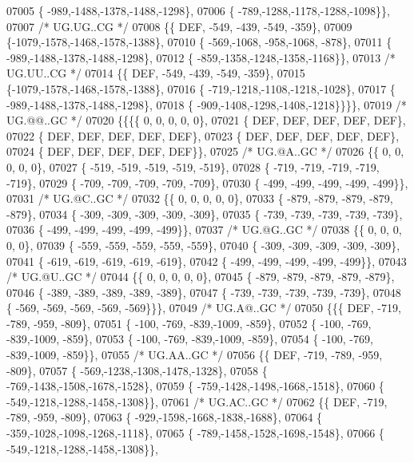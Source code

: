 \begin{DoxyCode}
07005 \{ -989,-1488,-1378,-1488,-1298\},
07006 \{ -789,-1288,-1178,-1288,-1098\}\},
07007 \textcolor{comment}{/* UG.UG..CG */}
07008 \{\{  DEF, -549, -439, -549, -359\},
07009 \{-1079,-1578,-1468,-1578,-1388\},
07010 \{ -569,-1068, -958,-1068, -878\},
07011 \{ -989,-1488,-1378,-1488,-1298\},
07012 \{ -859,-1358,-1248,-1358,-1168\}\},
07013 \textcolor{comment}{/* UG.UU..CG */}
07014 \{\{  DEF, -549, -439, -549, -359\},
07015 \{-1079,-1578,-1468,-1578,-1388\},
07016 \{ -719,-1218,-1108,-1218,-1028\},
07017 \{ -989,-1488,-1378,-1488,-1298\},
07018 \{ -909,-1408,-1298,-1408,-1218\}\}\}\},
07019 \textcolor{comment}{/* UG.@@..GC */}
07020 \{\{\{\{    0,    0,    0,    0,    0\},
07021 \{  DEF,  DEF,  DEF,  DEF,  DEF\},
07022 \{  DEF,  DEF,  DEF,  DEF,  DEF\},
07023 \{  DEF,  DEF,  DEF,  DEF,  DEF\},
07024 \{  DEF,  DEF,  DEF,  DEF,  DEF\}\},
07025 \textcolor{comment}{/* UG.@A..GC */}
07026 \{\{    0,    0,    0,    0,    0\},
07027 \{ -519, -519, -519, -519, -519\},
07028 \{ -719, -719, -719, -719, -719\},
07029 \{ -709, -709, -709, -709, -709\},
07030 \{ -499, -499, -499, -499, -499\}\},
07031 \textcolor{comment}{/* UG.@C..GC */}
07032 \{\{    0,    0,    0,    0,    0\},
07033 \{ -879, -879, -879, -879, -879\},
07034 \{ -309, -309, -309, -309, -309\},
07035 \{ -739, -739, -739, -739, -739\},
07036 \{ -499, -499, -499, -499, -499\}\},
07037 \textcolor{comment}{/* UG.@G..GC */}
07038 \{\{    0,    0,    0,    0,    0\},
07039 \{ -559, -559, -559, -559, -559\},
07040 \{ -309, -309, -309, -309, -309\},
07041 \{ -619, -619, -619, -619, -619\},
07042 \{ -499, -499, -499, -499, -499\}\},
07043 \textcolor{comment}{/* UG.@U..GC */}
07044 \{\{    0,    0,    0,    0,    0\},
07045 \{ -879, -879, -879, -879, -879\},
07046 \{ -389, -389, -389, -389, -389\},
07047 \{ -739, -739, -739, -739, -739\},
07048 \{ -569, -569, -569, -569, -569\}\}\},
07049 \textcolor{comment}{/* UG.A@..GC */}
07050 \{\{\{  DEF, -719, -789, -959, -809\},
07051 \{ -100, -769, -839,-1009, -859\},
07052 \{ -100, -769, -839,-1009, -859\},
07053 \{ -100, -769, -839,-1009, -859\},
07054 \{ -100, -769, -839,-1009, -859\}\},
07055 \textcolor{comment}{/* UG.AA..GC */}
07056 \{\{  DEF, -719, -789, -959, -809\},
07057 \{ -569,-1238,-1308,-1478,-1328\},
07058 \{ -769,-1438,-1508,-1678,-1528\},
07059 \{ -759,-1428,-1498,-1668,-1518\},
07060 \{ -549,-1218,-1288,-1458,-1308\}\},
07061 \textcolor{comment}{/* UG.AC..GC */}
07062 \{\{  DEF, -719, -789, -959, -809\},
07063 \{ -929,-1598,-1668,-1838,-1688\},
07064 \{ -359,-1028,-1098,-1268,-1118\},
07065 \{ -789,-1458,-1528,-1698,-1548\},
07066 \{ -549,-1218,-1288,-1458,-1308\}\},

\end{DoxyCode}
